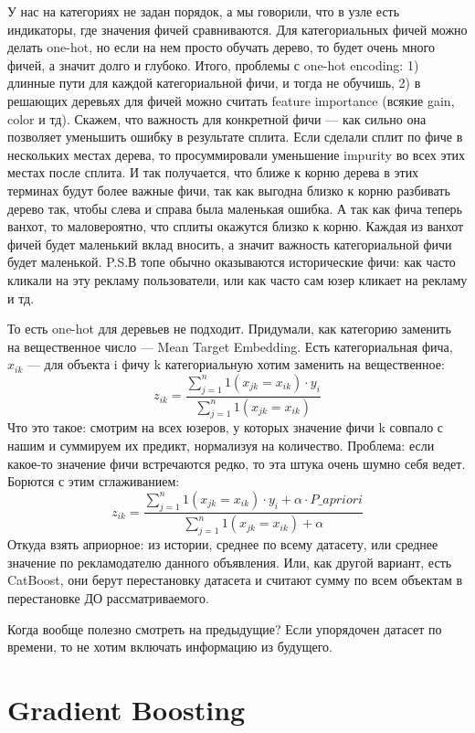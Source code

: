 \quad У нас на категориях не задан порядок, а мы говорили, что в узле есть индикаторы, где значения фичей сравниваются. Для категориальных фичей можно делать one-hot, но если на нем просто обучать дерево, то будет очень много фичей, а значит долго и глубоко. Итого, проблемы с one-hot encoding: 1) длинные пути для каждой категориальной фичи, и тогда не обучишь, 2) в решающих деревьях для фичей можно считать feature importance (всякие gain, color и тд). Скажем, что важность для конкретной фичи --- как сильно она позволяет уменьшить ошибку в результате сплита. Если сделали сплит по фиче в нескольких местах дерева, то просуммировали уменьшение impurity во всех этих местах после сплита. И так получается, что ближе к корню дерева в этих терминах будут более важные фичи, так как выгодна близко к корню разбивать дерево так, чтобы слева и справа была маленькая ошибка. А так как фича теперь ванхот, то маловероятно, что сплиты окажутся близко к корню. Каждая из ванхот фичей будет маленький вклад вносить, а значит важность категориальной фичи будет маленькой. P.S.В топе обычно оказываются исторические фичи: как часто кликали на эту рекламу пользователи, или как часто сам юзер кликает на рекламу и тд.

\quad То есть one-hot для деревьев не подходит. Придумали, как категорию заменить на вещественное число --- Mean Target Embedding. Есть категориальная фича, $x_{ik}$ --- для объекта i фичу k категориальную хотим заменить на вещественное:
$$z_{ik} = \frac{\sum_{j=1}^n {1(x_{jk} = x_{ik})\cdot y_i}}{\sum_{j=1}^n {1(x_{jk} = x_{ik})}}$$
Что это такое: смотрим на всех юзеров, у которых значение фичи k совпало с нашим и суммируем их предикт, нормализуя на количество. Проблема: если какое-то значение фичи встречаются редко, то эта штука очень шумно себя ведет. Борются с этим сглаживанием:
$$z_{ik} = \frac{\sum_{j=1}^n {1(x_{jk} = x_{ik})\cdot y_i + \alpha \cdot P\_apriori}}{\sum_{j=1}^n {1(x_{jk} = x_{ik}) + \alpha}}$$
Откуда взять априорное: из истории, среднее по всему датасету, или среднее значение по рекламодателю данного объявления. Или, как другой вариант, есть CatBoost, они берут перестановку датасета и считают сумму по всем объектам в перестановке ДО рассматриваемого.

Когда вообще полезно смотреть на предыдущие? Если упорядочен датасет по времени, то не хотим включать информацию из будущего.

\section{Gradient Boosting}
